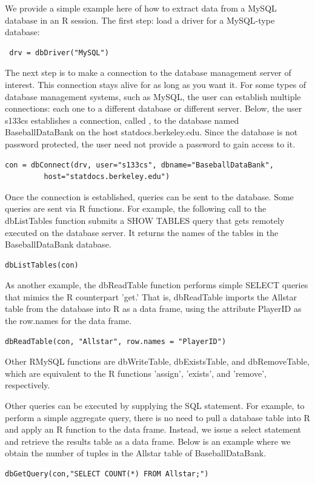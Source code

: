 We provide a simple example here of how to extract data from a
MySQL database in an R session.
The first step: load a driver for a MySQL-type database:
\begin{verbatim}
 drv = dbDriver("MySQL")
\end{verbatim}
The next step is to make a connection to the 
database management server of interest.
This connection stays alive for as long as you want it.
For some types of database management systems, such as MySQL, 
the user can establish multiple connections: 
each one to a different database or different server.
Below, the user s133cs establishes a connection, called 
, to the database named BaseballDataBank on
the host statdocs.berkeley.edu. 
Since the database is not password protected, the user need
not provide a password to gain access to it. 
\begin{verbatim}
con = dbConnect(drv, user="s133cs", dbname="BaseballDataBank",
         host="statdocs.berkeley.edu")
\end{verbatim}

Once the connection is established, queries can be sent to
the database.  Some queries are sent via R functions.
For example, the following call to the dbListTables function 
submits a SHOW TABLES query that gets remotely executed on the
database server. It returns the names of the
tables in the BaseballDataBank database. 
\begin{verbatim}
dbListTables(con)
\end{verbatim}

As another example, the dbReadTable function performs simple
SELECT queries that mimics the R counterpart  'get.'
That is, dbReadTable imports the Allstar table from the database into R
as a data frame, using the attribute PlayerID as the row.names for
the data frame. 
\begin{verbatim}
dbReadTable(con, "Allstar", row.names = "PlayerID")
\end{verbatim}
Other RMySQL functions are dbWriteTable, dbExistsTable,
and dbRemoveTable, which are equivalent to the R functions 'assign',
'exists', and 'remove', respectively. 

Other queries can be executed by supplying the SQL statement.
For example, to perform a simple aggregate query, there is no need 
to pull a database table into R and apply an R function to the data frame. 
Instead, we issue a select statement and retrieve the results table
as a data frame. Below is an example where we obtain the number of 
tuples in the Allstar table of BaseballDataBank.
\begin{verbatim}
dbGetQuery(con,"SELECT COUNT(*) FROM Allstar;")
\end{verbatim}

